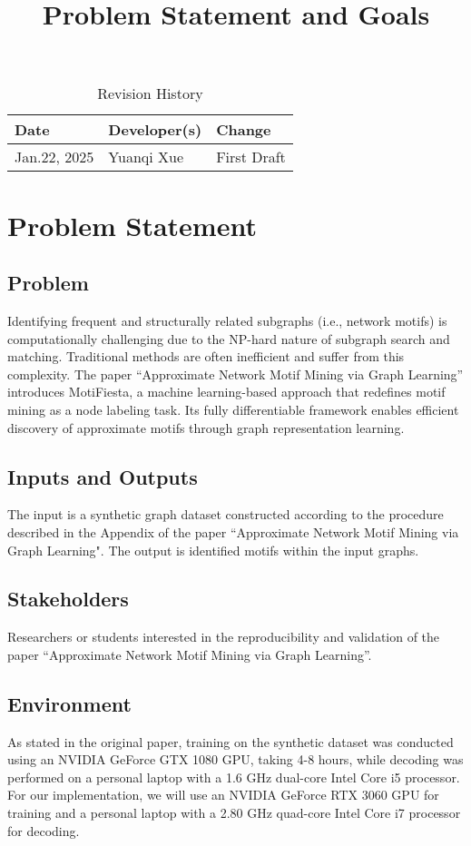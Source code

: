 \documentclass{article}
\title{Problem Statement and Goals\\\progname}
\author{\authname}
\date{}
\begin{document}
\maketitle

\begin{table}[hp]
\caption{Revision History} \label{TblRevisionHistory}
\begin{tabularx}{\textwidth}{llX}
\toprule
\textbf{Date} & \textbf{Developer(s)} & \textbf{Change}\\
\midrule
Jan.22, 2025 & Yuanqi Xue & First Draft\\
\bottomrule
\end{tabularx}
\end{table}

\section{Problem Statement}
\subsection{Problem}
Identifying frequent and structurally related subgraphs (i.e., network motifs) is computationally challenging due to the NP-hard nature of subgraph search and matching. Traditional methods are often inefficient and suffer from this complexity. The paper ``Approximate Network Motif Mining via Graph Learning'' introduces MotiFiesta, a machine learning-based approach that redefines motif mining as a node labeling task. Its fully differentiable framework enables efficient discovery of approximate motifs through graph representation learning.

\subsection{Inputs and Outputs}
The input is a synthetic graph dataset constructed according to the procedure described in the Appendix of the paper ``Approximate Network Motif Mining via Graph Learning". The output is identified motifs within the input graphs.


\subsection{Stakeholders}
Researchers or students interested in the reproducibility and validation of the paper ``Approximate Network Motif Mining via Graph Learning''.

\subsection{Environment}
As stated in the original paper, training on the synthetic dataset was conducted using an NVIDIA GeForce GTX 1080 GPU, taking 4-8 hours, while decoding was performed on a personal laptop with a 1.6 GHz dual-core Intel Core i5 processor. For our implementation, we will use an NVIDIA GeForce RTX 3060 GPU for training and a personal laptop with a 2.80 GHz quad-core Intel Core i7 processor for decoding.
\end{document}
